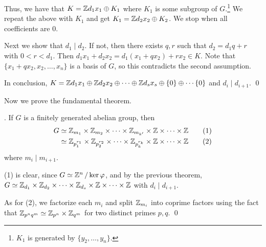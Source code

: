 Thus, we have that \(K = \mathbb{Z} d_1 x_1 \oplus K_1\) where \(K_1\) is some subgroup of \(G\).\footnote{\(K_1\) is generated by \(\{y_2, \dots, y_n\}\).} We repeat the above with \(K_1\) and get \(K_1 = \mathbb{Z} d_2 x_2 \oplus K_2\). We stop when all coefficients are \(0\).

 Next we show that \(d_1 \mid d_2\). If not, then there exists \(q, r\) such that \(d_2 = d_1q+r\) with \(0 < r < d_1\). Then \(d_1x_1 + d_2x_2 = d_1(x_1 + qx_2) + rx_2 \in K\). Note that \(\{x_1 + qx_2, x_2, \dots, x_n\}\) is a basis of \(G\), so this contradicts the second assumption.

In conclusion, \(K = \mathbb{Z} d_1 x_1 \oplus \mathbb{Z} d_2 x_2 \oplus \cdots \oplus \mathbb{Z} d_s x_s \oplus \{0\} \oplus \cdots \{0\}\) and \(d_i \mid d_{i+1}\). \qed

\medskip

Now we prove the fundamental theorem.

\thm. If \(G\) is a finitely generated abelian group, then
\[
    \begin{aligned}
        G & \simeq \mathbb{Z}_{m_1} \times \mathbb{Z}_{m_2} \times \cdots \times \mathbb{Z}_{m_{k'}} \times \mathbb{Z} \times \cdots \times \mathbb{Z} \qquad (1)                \\
          & \simeq \mathbb{Z}_{p_1^{r_1}} \times \mathbb{Z}_{p_2^{r_2}} \times \cdots \times \mathbb{Z}_{p_k^{r_k}} \times \mathbb{Z} \times \cdots \times \mathbb{Z} \qquad (2)
    \end{aligned}
\]
where \(m_i \mid m_{i+1}\).

\pf (1) is clear, since \(G \simeq \mathbb{Z}^n \operatorname{/} \ker \varphi\), and by the previous theorem, \(G \simeq \mathbb{Z}_{d_1} \times \mathbb{Z}_{d_2} \times \cdots \times \mathbb{Z}_{d_s} \times \mathbb{Z} \times \cdots \times \mathbb{Z}\) with \(d_i \mid d_{i+1}\).

As for (2), we factorize each \(m_i\) and split \(\mathbb{Z}_{m_i}\) into coprime factors using the fact that \(\mathbb{Z}_{p^nq^m} \simeq \mathbb{Z}_{p^n} \times \mathbb{Z}_{q^m}\) for two distinct primes \(p, q\). \qed

\pagebreak
